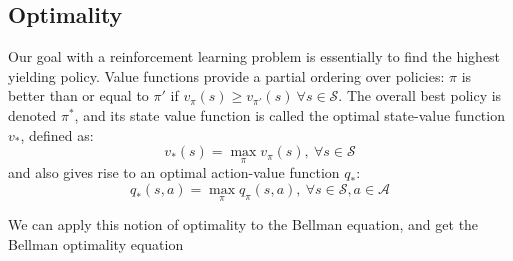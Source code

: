 \documentclass[12pt, reqno]{article}
\theoremstyle{plain}    \newtheorem{theorem}{Theorem}[section]
\theoremstyle{plain}    \newtheorem{lemma}[theorem]{Lemma}
\theoremstyle{plain}    \newtheorem{claim}[theorem]{Claim}
\theoremstyle{plain}    \newtheorem{definition}{Definition}[section]
\theoremstyle{plain}    \newtheorem{proposition}[theorem]{Proposition}
\theoremstyle{plain}    \newtheorem{corollary}[theorem]{Corollary}
\theoremstyle{plain}    \newtheorem{example}[definition]{Example}
\numberwithin{equation}{section}
\begin{document}
\subsection{Optimality}

Our goal with a reinforcement learning problem is essentially to find the
highest yielding policy. Value functions provide a partial ordering over
policies: \(\pi\) is better than or equal to \(\pi'\) if \(v_{\pi}(s) \ge
v_{\pi'}(s) \ \forall s \in \mathcal{S}\). The overall best policy is denoted
\(\pi^*\), and its state value function is called the optimal state-value
function \(v_*\), defined as:
\[v_*(s) = \max_{\pi}v_{\pi}(s), \ \forall s \in \mathcal{S} \]
and also gives rise to an optimal action-value function \(q_*\):
\[q_*(s,a) = \max_{\pi}q_{\pi}(s,a), \ \forall s \in \mathcal{S}, a \in \mathcal{A}\]

We can apply this notion of optimality to the Bellman equation, and get the
Bellman optimality equation  
\end{document}
